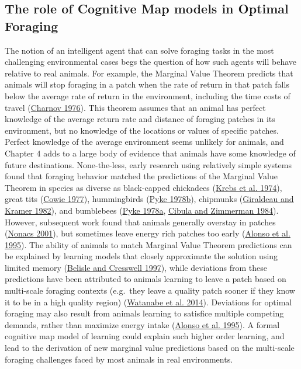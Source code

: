 \documentclass[twoside,12pt,final]{ucthesis-CA2012}
\begin{document}
\begin{ucmainmatter}
\hypertarget{the-role-of-cognitive-map-models-in-optimal-foraging}{%
\section{The role of Cognitive Map models in Optimal Foraging}\label{the-role-of-cognitive-map-models-in-optimal-foraging}}

The notion of an intelligent agent that can solve foraging tasks in the most challenging environmental cases begs the question of how such agents will behave relative to real animals. For example, the Marginal Value Theorem predicts that animals will stop foraging in a patch when the rate of return in that patch falls below the average rate of return in the environment, including the time costs of travel (\protect\hyperlink{ref-charnov1976}{Charnov 1976}). This theorem assumes that an animal has perfect knowledge of the average return rate and distance of foraging patches in its environment, but no knowledge of the locations or values of specific patches. Perfect knowledge of the average environment seems unlikely for animals, and Chapter 4 adds to a large body of evidence that animals have some knowledge of future destinations. None-the-less, early research using relatively simple systems found that foraging behavior matched the predictions of the Marginal Value Theorem in species as diverse as black-capped chickadees (\protect\hyperlink{ref-krebs1974}{Krebs et al. 1974}), great tits (\protect\hyperlink{ref-cowie1977}{Cowie 1977}), hummingbirds (\protect\hyperlink{ref-pyke1978a}{Pyke 1978b}), chipmunks (\protect\hyperlink{ref-giraldeau1982}{Giraldeau and Kramer 1982}), and bumblebees (\protect\hyperlink{ref-pyke1978}{Pyke 1978a}, \protect\hyperlink{ref-cibula1984}{Cibula and Zimmerman 1984}). However, subsequent work found that animals generally overstay in patches (\protect\hyperlink{ref-nonacs2001}{Nonacs 2001}), but sometimes leave energy rich patches too early (\protect\hyperlink{ref-alonso1995}{Alonso et al. 1995}). The ability of animals to match Marginal Value Theorem predictions can be explained by learning models that closely approximate the solution using limited memory (\protect\hyperlink{ref-belisle1997}{Belisle and Cresswell 1997}), while deviations from these predictions have been attributed to animals learning to leave a patch based on multi-scale foraging contexts (e.g.~they leave a quality patch sooner if they know it to be in a high quality region) (\protect\hyperlink{ref-watanabe2014}{Watanabe et al. 2014}). Deviations for optimal foraging may also result from animals learning to satisfice multiple competing demands, rather than maximize energy intake (\protect\hyperlink{ref-alonso1995}{Alonso et al. 1995}). A formal cognitive map model of learning could explain such higher order learning, and lead to the derivation of new marginal value predictions based on the multi-scale foraging challenges faced by most animals in real environments.


\end{ucmainmatter}
\end{document}

